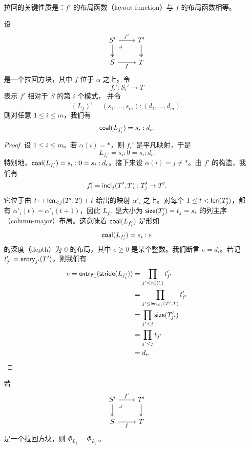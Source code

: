 拉回的关键性质是：$f'$ 的布局函数（layout function）与 $f$ 的布局函数相等。

\begin{lemma}\label{pullbacklemma}
    设
    \[ \begin{tikzcd} 
    S' \ar[r,"f'"] \ar[d, two heads] \arrow[dr, phantom, "\lrcorner", very near start] & T' \ar[d,two heads] \\
    S \ar[r,swap,"f"] & T
    \end{tikzcd} \]
    是一个拉回方块，其中 $f$ 位于 $\alpha$ 之上。令
    \[f_i' : S_i' \to T\]
    表示 $f'$ 相对于 $S$ 的第 $i$ 个模式，
    并令
    \[(L_f)^\flat = (s_1,\dots,s_m):(d_1,\dots,d_m).\]
    则对任意 $1 \leq i \leq m$，我们有
    \[
    \mathsf{coal}(L_{f_i'}) = s_i:d_i.
    \]
\end{lemma}
\begin{proof}
    设 $1 \leq i \leq m$。若 $\alpha(i) = *$，则 $f_i'$ 是平凡映射，于是
    \[
    L_{f_i'} = s_i : 0 = s_i : d_i.
    \]
    特别地，$\mathsf{coal}(L_{f_i'}) = s_i:0 = s_i:d_i$。接下来设 $\alpha(i) = j \neq *$。由 $f'$ 的构造，我们有
    \[f_i' = \mathsf{incl}_j(T',T):T_j' \to T'.\]
    它位于由 $t \mapsto \mathsf{len}_{<j}(T',T) + t$ 给出的映射 $\alpha'_i$ 之上。对每个 $1 \leq t < \mathsf{len}(T'_j)$，都有 $\alpha'_i(t) = \alpha'_i(t+1)$，因此 $L_{f_i'}$ 是大小为 $\mathsf{size}(T_j') = t_j = s_i$ 的列主序（column-major）布局。这意味着 $\mathsf{coal}(L_{f_i'})$ 是形如
    \[
    \mathsf{coal}(L_{f_i'}) = s_i : e
    \]
    的深度（depth）为 $0$ 的布局，其中 $e \geq 0$ 是某个整数。我们断言 $e = d_i$。若记 $t_{j'}' = \mathsf{entry}_{j'}(T')$，则我们有
    \begin{align*}
    e = \mathsf{entry}_1(\mathsf{stride}(L_{f_i'})) & = \prod_{j' < \alpha_i'(1)} t_{j'}'\\
    & = \prod_{j' \leq  \mathsf{len}_{<j}(T',T)} t_{j'}'\\
    & = \prod_{j' < j} \mathsf{size}(T_{j'}')\\
    & = \prod_{j' < j} t_{j'}\\
    & = d_i .
    \end{align*}
\end{proof}


\begin{proposition}\label{pullbackproposition}
    若
    \[ \begin{tikzcd} 
    S' \ar[r,"f'"] \ar[d, two heads] \arrow[dr, phantom, "\lrcorner", very near start] & T' \ar[d,two heads] \\
    S \ar[r,swap,"f"] & T
    \end{tikzcd} \]
    是一个拉回方块，则 $\Phi_{L_f} = \Phi_{L_{f'}}$。
\end{proposition}

